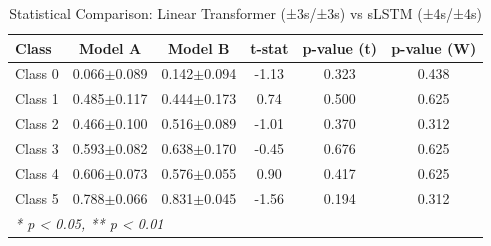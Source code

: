 \begin{table}[htbp]
\centering
\caption{Statistical Comparison: Linear Transformer (±3s/±3s) vs sLSTM (±4s/±4s)}
\label{tab:comparison_class_linear_transformer_±3s_±3s_vs_slstm_±4s_±4s}
\begin{tabular}{lccccc}
\toprule
\textbf{Class} & \textbf{Model A} & \textbf{Model B} & \textbf{t-stat} & \textbf{p-value (t)} & \textbf{p-value (W)} \\
\midrule
Class 0 & 0.066$\pm$0.089 & 0.142$\pm$0.094 & -1.13 & 0.323 & 0.438 \\
Class 1 & 0.485$\pm$0.117 & 0.444$\pm$0.173 & 0.74 & 0.500 & 0.625 \\
Class 2 & 0.466$\pm$0.100 & 0.516$\pm$0.089 & -1.01 & 0.370 & 0.312 \\
Class 3 & 0.593$\pm$0.082 & 0.638$\pm$0.170 & -0.45 & 0.676 & 0.625 \\
Class 4 & 0.606$\pm$0.073 & 0.576$\pm$0.055 & 0.90 & 0.417 & 0.625 \\
Class 5 & 0.788$\pm$0.066 & 0.831$\pm$0.045 & -1.56 & 0.194 & 0.312 \\
\bottomrule
\multicolumn{6}{l}{\textit{* p < 0.05, ** p < 0.01}} \\
\end{tabular}
\end{table}